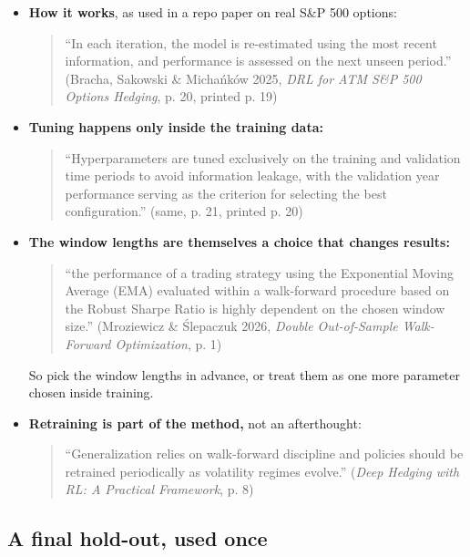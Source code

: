 \documentclass{article}
\begin{document}
\begin{itemize}

\item \textbf{How it works}, as used in a repo paper on real S\&P 500 options:

\begin{quote}``In each iteration, the model is re-estimated using the most recent information, and performance is assessed on the next unseen period.'' (Bracha, Sakowski \& Michańków 2025, \emph{DRL for ATM S\&P 500 Options Hedging}, p. 20, printed p. 19)\end{quote}

\item \textbf{Tuning happens only inside the training data:}

\begin{quote}``Hyperparameters are tuned exclusively on the training and validation time periods to avoid information leakage, with the validation year performance serving as the criterion for selecting the best configuration.'' (same, p. 21, printed p. 20)\end{quote}

\item \textbf{The window lengths are themselves a choice that changes results:}

\begin{quote}``the performance of a trading strategy using the Exponential Moving Average (EMA) evaluated within a walk-forward procedure based on the Robust Sharpe Ratio is highly dependent on the chosen window size.'' (Mroziewicz \& \'{S}lepaczuk 2026, \emph{Double Out-of-Sample Walk-Forward Optimization}, p. 1)\end{quote}

So pick the window lengths in advance, or treat them as one more parameter chosen inside training.

\item \textbf{Retraining is part of the method,} not an afterthought:

\begin{quote}``Generalization relies on walk-forward discipline and policies should be retrained periodically as volatility regimes evolve.'' (\emph{Deep Hedging with RL: A Practical Framework}, p. 8)\end{quote}

\end{itemize}

\subsection{A final hold-out, used once}
\end{document}
